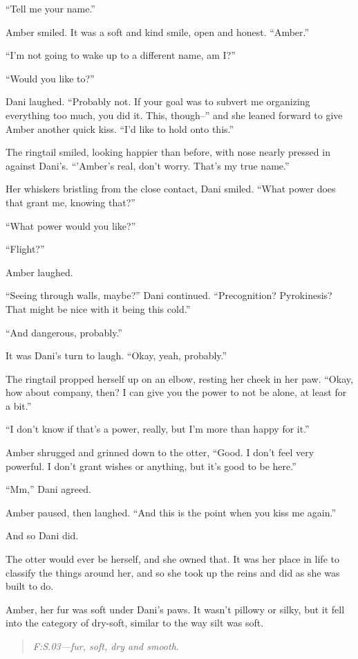 ``Tell me your name.''

Amber smiled. It was a soft and kind smile, open and honest. ``Amber.''

``I'm not going to wake up to a different name, am I?''

``Would you like to?''

Dani laughed. ``Probably not. If your goal was to subvert me organizing everything too much, you did it. This, though--'' and she leaned forward to give Amber another quick kiss. ``I'd like to hold onto this.''

The ringtail smiled, looking happier than before, with nose nearly pressed in against Dani's. ``'Amber's real, don't worry. That's my true name.''

Her whiskers bristling from the close contact, Dani smiled. ``What power does that grant me, knowing that?''

``What power would you like?''

``Flight?''

Amber laughed.

``Seeing through walls, maybe?'' Dani continued. ``Precognition? Pyrokinesis? That might be nice with it being this cold.''

``And dangerous, probably.''

It was Dani's turn to laugh. ``Okay, yeah, probably.''

The ringtail propped herself up on an elbow, resting her cheek in her paw. ``Okay, how about company, then? I can give you the power to not be alone, at least for a bit.''

``I don't know if that's a power, really, but I'm more than happy for it.''

Amber shrugged and grinned down to the otter, ``Good. I don't feel very powerful. I don't grant wishes or anything, but it's good to be here.''

``Mm,'' Dani agreed.

Amber paused, then laughed. ``And this is the point when you kiss me again.''

And so Dani did.

The otter would ever be herself, and she owned that. It was her place in life to classify the things around her, and so she took up the reins and did as she was built to do.

Amber, her fur was soft under Dani's paws. It wasn't pillowy or silky, but it fell into the category of dry-soft, similar to the way silt was soft.

\begin{quote}
\emph{F:S.03---fur, soft, dry and smooth}.
\end{quote}

